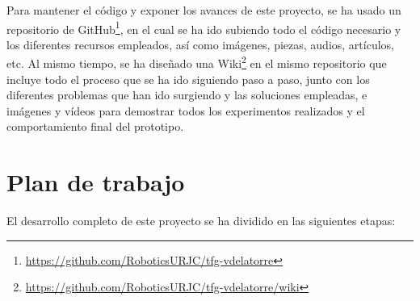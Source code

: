 Para mantener el código y exponer los avances de este proyecto, se ha usado un repositorio de GitHub\footnote{\url{https://github.com/RoboticsURJC/tfg-vdelatorre}}, en el cual se ha ido subiendo todo el código necesario y los diferentes recursos empleados, así como imágenes, piezas, audios, artículos, etc. Al mismo tiempo, se ha diseñado una Wiki\footnote{\url{https://github.com/RoboticsURJC/tfg-vdelatorre/wiki}} en el mismo repositorio que incluye todo el proceso que se ha ido siguiendo paso a paso, junto con los diferentes problemas que han ido surgiendo y las soluciones empleadas, e imágenes y vídeos para demostrar todos los experimentos realizados y el comportamiento final del prototipo.

\section{Plan de trabajo}
\label{sec:plantrabajo}

El desarrollo completo de este proyecto se ha dividido en las siguientes etapas:

